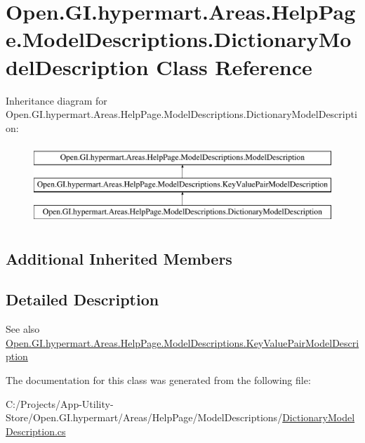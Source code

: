\hypertarget{class_open_1_1_g_i_1_1hypermart_1_1_areas_1_1_help_page_1_1_model_descriptions_1_1_dictionary_model_description}{}\section{Open.\+G\+I.\+hypermart.\+Areas.\+Help\+Page.\+Model\+Descriptions.\+Dictionary\+Model\+Description Class Reference}
\label{class_open_1_1_g_i_1_1hypermart_1_1_areas_1_1_help_page_1_1_model_descriptions_1_1_dictionary_model_description}


 


Inheritance diagram for Open.\+G\+I.\+hypermart.\+Areas.\+Help\+Page.\+Model\+Descriptions.\+Dictionary\+Model\+Description\+:\begin{figure}[H]
\begin{center}
\leavevmode
\includegraphics[height=3.000000cm]{class_open_1_1_g_i_1_1hypermart_1_1_areas_1_1_help_page_1_1_model_descriptions_1_1_dictionary_model_description}
\end{center}
\end{figure}
\subsection*{Additional Inherited Members}


\subsection{Detailed Description}


\begin{DoxySeeAlso}{See also}
\hyperlink{class_open_1_1_g_i_1_1hypermart_1_1_areas_1_1_help_page_1_1_model_descriptions_1_1_key_value_pair_model_description}{Open.\+G\+I.\+hypermart.\+Areas.\+Help\+Page.\+Model\+Descriptions.\+Key\+Value\+Pair\+Model\+Description}


\end{DoxySeeAlso}


The documentation for this class was generated from the following file\+:\begin{DoxyCompactItemize}
\item 
C\+:/\+Projects/\+App-\/\+Utility-\/\+Store/\+Open.\+G\+I.\+hypermart/\+Areas/\+Help\+Page/\+Model\+Descriptions/\hyperlink{_dictionary_model_description_8cs}{Dictionary\+Model\+Description.\+cs}\end{DoxyCompactItemize}
